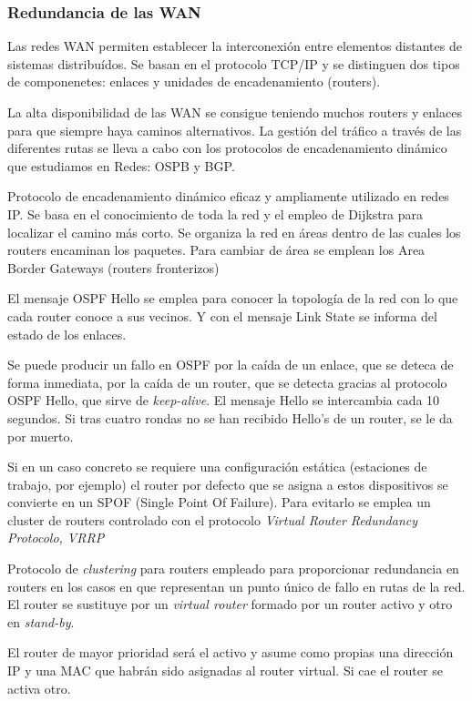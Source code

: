 \subsubsection{Redundancia de las WAN}
Las redes WAN permiten establecer la interconexión entre elementos distantes de sistemas distribuídos. Se basan en el protocolo TCP/IP y se distinguen dos tipos de componenetes: enlaces y unidades de encadenamiento (routers).

La alta disponibilidad de las WAN se consigue teniendo muchos routers y enlaces para que siempre haya caminos alternativos. La gestión del tráfico a través de las diferentes rutas se lleva a cabo con los protocolos de encadenamiento dinámico que estudiamos en Redes: OSPB y BGP.

\begin{defn}[OSPF]
Protocolo de encadenamiento dinámico eficaz y ampliamente utilizado en redes IP. Se basa en el conocimiento de toda la red y el empleo de Dijkstra para localizar el camino más corto. Se organiza la red en áreas dentro de las cuales los routers encaminan los paquetes. Para cambiar de área se emplean los Area Border Gateways (routers fronterizos)

El mensaje OSPF Hello se emplea para conocer la topología de la red con lo que cada router conoce a sus vecinos. Y con el mensaje Link State se informa del estado de los enlaces.
\end{defn}

Se puede producir un fallo en OSPF por la caída de un enlace, que se deteca de forma inmediata, por la caída de un router, que se detecta gracias al protocolo OSPF Hello, que sirve de \textit{keep-alive}. El mensaje Hello se intercambia cada 10 segundos. Si tras cuatro rondas no se han recibido Hello's de un router, se le da por muerto.

Si en un caso concreto se requiere una configuración estática (estaciones de trabajo, por ejemplo) el router por defecto que se asigna a estos dispositivos se convierte en un SPOF (Single Point Of Failure). Para evitarlo se emplea un cluster de routers controlado con el protocolo \textit{Virtual Router Redundancy Protocolo, VRRP}

\begin{defn}[VRRP]
Protocolo de \textit{clustering} para routers empleado para proporcionar redundancia en routers en los casos en que representan un punto único de fallo en rutas de la red. El router se sustituye por un \textit{virtual router} formado por un router activo y otro en \textit{stand-by}.

El router de mayor prioridad será el activo y asume como propias una dirección IP y una MAC que habrán sido asignadas al router virtual. Si cae el router se activa otro.
\end{defn}

